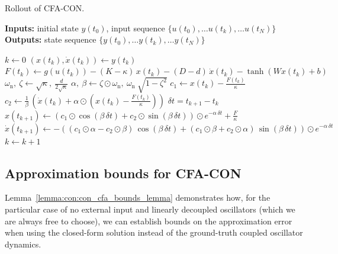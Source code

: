 \begin{algorithm}
\caption{Rollout of \gls{CFA-CON}.}\label{alg:con:con_cfa}
\hspace*{\algorithmicindent} \textbf{Inputs:} initial state $y(t_0)$, input sequence $\{u(t_0), \dots u(t_k), \dots u(t_N) \}$\\
\hspace*{\algorithmicindent} \textbf{Outputs:} state sequence $\{y(t_0), \dots y(t_k), \dots y(t_N) \}$
\begin{algorithmic}[1]
    \State $k \gets 0$
        \State $(x(t_k), \dot{x}(t_k)) \gets y(t_k)$
        \State $F(t_k) \gets g(u(t_k)) - (K - \kappa) \, x(t_k) - (D-d) \, \dot{x}(t_k) - \tanh \left (Wx(t_k)+b \right )$
        \State $\omega_\mathrm{n}, \: \zeta \gets \sqrt{\kappa}, \: \frac{d}{2 \sqrt{\kappa}}$ 
        \State $\alpha, \: \beta  \gets \zeta \odot \omega_\mathrm{n}, \: \omega_\mathrm{n} \: \sqrt{1-\zeta^2}$
        \State $c_{1} \gets x(t_k) - \frac{F(t_k)}{\kappa}$  
        \State $c_{2} \gets \frac{1}{\beta} \, \left ( \dot{x}(t_k) + \alpha \odot \left (x(t_k) - \frac{F(t_k)}{\kappa} \right ) \right )$
        \State $\delta t = t_{k+1} - t_k$  \\
        \State $x(t_{k+1}) \gets  \left ( c_{1} \odot \cos(\beta \, \delta t) +  c_{2} \odot \sin(\beta \, \delta t) \right ) \odot e^{-\alpha \, \delta t} + \frac{F}{\kappa}$
        \State $\dot{x}(t_{k+1}) \gets -\left ( (c_{1} \odot \alpha - c_{2} \odot \beta) \, \cos(\beta \, \delta t) +  (c_{1} \odot \beta + c_{2} \odot \alpha) \, \sin(\beta \, \delta t) \right ) \odot e^{-\alpha \, \delta t}$
        \State $k \gets k+1$  
    \EndWhile
\end{algorithmic}
\end{algorithm}

\subsection{Approximation bounds for CFA-CON}
Lemma~\ref{lemma:con:con_cfa_bounds_lemma} demonstrates how, for the particular case of no external input and linearly decoupled oscillators (which we are always free to choose), we can establish bounds on the approximation error when using the closed-form solution instead of the ground-truth coupled oscillator dynamics.

